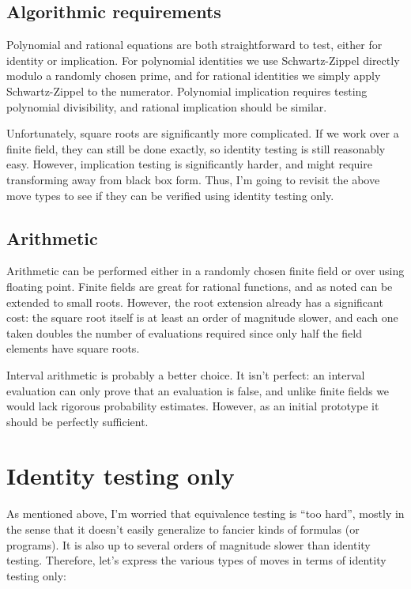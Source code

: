 \documentclass[11pt]{article}
\begin{document}
\subsection{Algorithmic requirements}

Polynomial and rational equations are both straightforward to test, either for identity or implication.
For polynomial identities we use Schwartz-Zippel directly modulo a randomly chosen prime, and for rational
identities we simply apply Schwartz-Zippel to the numerator.  Polynomial implication requires testing
polynomial divisibility, and rational implication should be similar.

Unfortunately, square roots are significantly more complicated.  If we work over a finite field, they
can still be done exactly, so identity testing is still reasonably easy.  However, implication testing
is significantly harder, and might require transforming away from black box form.  Thus, I'm going
to revisit the above move types to see if they can be verified using identity testing only.

\subsection{Arithmetic}

Arithmetic can be performed either in a randomly chosen finite field or over using floating point.
Finite fields are great for rational functions, and as noted can be extended to small roots.  However,
the root extension already has a significant cost: the square root itself is at least an order of magnitude
slower, and each one taken doubles the number of evaluations required since only half the field elements
have square roots.

Interval arithmetic is probably a better choice.  It isn't perfect: an interval evaluation can only prove
that an evaluation is false, and unlike finite fields we would lack rigorous probability estimates.
However, as an initial prototype it should be perfectly sufficient.

\section{Identity testing only}

As mentioned above, I'm worried that equivalence testing is ``too hard'', mostly in the sense that it
doesn't easily generalize to fancier kinds of formulas (or programs).  It is also up to several orders
of magnitude slower than identity testing.  Therefore, let's express the various types of moves in terms
of identity testing only:
\end{document}
